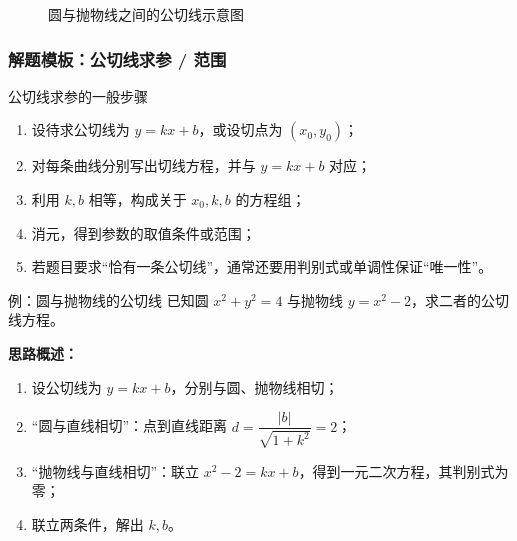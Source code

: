 \documentclass[a4paper,11pt]{ctexart}
\begin{document}
\begin{figure}[htbp]
  \centering
  \caption{圆与抛物线之间的公切线示意图}
\end{figure}

\subsubsection{解题模板：公切线求参 / 范围}

\begin{summarybox}{公切线求参的一般步骤}
  \begin{enumerate}
    \item 设待求公切线为 $y=kx+b$，或设切点为 $(x_0,y_0)$；
    \item 对每条曲线分别写出切线方程，并与 $y=kx+b$ 对应；
    \item 利用 $k,b$ 相等，构成关于 $x_0,k,b$ 的方程组；
    \item 消元，得到参数的取值条件或范围；
    \item 若题目要求“恰有一条公切线”，通常还要用判别式或单调性保证“唯一性”。
  \end{enumerate}
\end{summarybox}

\begin{examplebox}[mathnote coverage=soft]{例：圆与抛物线的公切线}
  已知圆 $x^2+y^2=4$ 与抛物线 $y=x^2-2$，求二者的公切线方程。
\end{examplebox}

\textbf{思路概述：}
\begin{enumerate}
  \item 设公切线为 $y=kx+b$，分别与圆、抛物线相切；
  \item “圆与直线相切”：点到直线距离 $d=\dfrac{|b|}{\sqrt{1+k^2}}=2$；
  \item “抛物线与直线相切”：联立 $x^2-2=kx+b$，得到一元二次方程，其判别式为零；
  \item 联立两条件，解出 $k,b$。
\end{enumerate}
\end{document}
